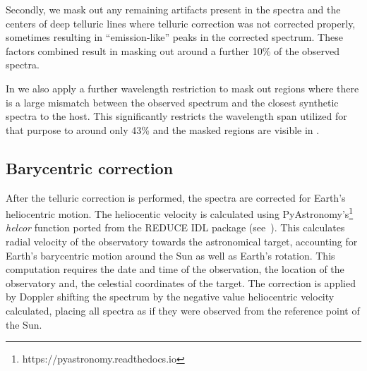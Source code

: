 Secondly, we mask out any remaining artifacts present in the spectra and the centers of deep telluric lines where telluric correction was not corrected properly, sometimes resulting in ``emission-like'' peaks in the corrected spectrum. These factors combined result in masking out around a further 10\% of the observed spectra. 

In  we also apply a further wavelength restriction to mask out regions where there is a large mismatch between the observed spectrum and the closest synthetic spectra to the host. This significantly restricts the wavelength span utilized for that purpose to around only 43\% and the masked regions are visible in . 




\subsection{Barycentric correction}
After the telluric correction is performed, the spectra are corrected for Earth's heliocentric motion. The heliocentic velocity is calculated using PyAstronomy's\footnote{https://pyastronomy.readthedocs.io} \emph{helcor} function ported from the REDUCE IDL package (see~\citet[][]{piskunov_new_2002}). This calculates radial velocity of the observatory towards the astronomical target, accounting for Earth's barycentric motion around the Sun as well as Earth's rotation. This computation requires the date and time of the observation, the location of the observatory and, the celestial coordinates of the target.
The correction is applied by Doppler shifting the spectrum by the negative value heliocentric velocity calculated, placing all spectra as if they were observed from the reference point of the Sun.
